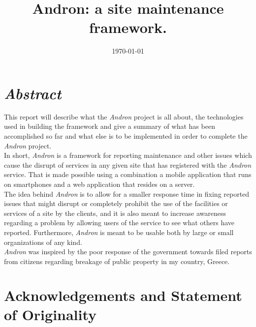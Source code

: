 \documentclass[12pt]{ecsproject}     %
\begin{document}
\frontmatter
\addresses{\goupname \\ \deptname \\ \univname}
\date{\today}
\title{Andron: a site maintenance framework.}



\maketitle
\section*{\textit{Abstract}}
This report will describe what the \emph{Andron} project is all about, the technologies used in building the framework and give a summary of what has been accomplished so far and what else is to be implemented in order to complete the \emph{Andron} project. \\

In short, \emph{Andron} is a framework for reporting maintenance and other issues which cause the disrupt of services in any given site that has registered with the \emph{Andron} service. That is made possible using a combination a mobile application that runs on smartphones and a web application that resides on a server. \\

The idea behind \emph{Andron} is to allow for a smaller response time in fixing reported issues that might disrupt or completely prohibit the use of the facilities or services of a site by the clients, and it is also meant to increase awareness regarding a problem by allowing users of the service to see what others have reported. Furthermore, \emph{Andron} is meant to be usable both by large or small organizations of any kind.\\

\emph{Andron} was inspired by the poor response of the government towards filed reports from citizens regarding breakage of public property in my country, Greece.

\tableofcontents
\mainmatter

\section{Acknowledgements and Statement of Originality}
\end{document}
